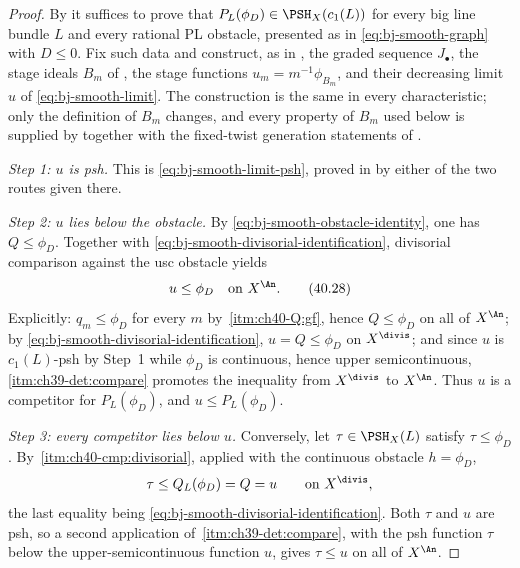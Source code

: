 \begin{proof}
By  it suffices to prove that
$P_L(\phi_D)\in\PSH_X(c_1(L))$ for every big line bundle $L$ and every
rational PL obstacle, presented as in \eqref{eq:bj-smooth-graph} with
$D\le0$.  Fix such data and construct, as in
, the graded sequence
$J_\bullet$, the stage ideals $B_m$ of , the
stage functions $u_m=m^{-1}\phi_{B_m}$, and their decreasing limit $u$ of
\eqref{eq:bj-smooth-limit}.  The construction is the same in every
characteristic; only the definition of $B_m$ changes, and every property of
$B_m$ used below is supplied by
 together with the fixed-twist generation
statements of .

\emph{Step 1: $u$ is psh.}  This is \eqref{eq:bj-smooth-limit-psh}, proved
in  by either of the two routes given there.

\emph{Step 2: $u$ lies below the obstacle.}
By \eqref{eq:bj-smooth-obstacle-identity}, one has $Q\le\phi_D$.
Together with \eqref{eq:bj-smooth-divisorial-identification}, divisorial
comparison against the usc obstacle yields
\[
                              u\le\phi_D
                              \quad\text{on }X^{\An}.
\tag{40.28}\label{eq:bj-smooth-limit-below-obstacle}
\]
Explicitly: $q_m\le\phi_D$ for every $m$ by
\,\cref{itm:ch40-Q:gf}, hence $Q\le\phi_D$ on all
of $X^{\An}$; by \eqref{eq:bj-smooth-divisorial-identification},
$u=Q\le\phi_D$ on $X^{\divis}$; and since $u$ is
$c_1(L)$-psh by Step~1 while $\phi_D$ is continuous, hence upper
semicontinuous,
\,\cref{itm:ch39-det:compare} promotes
the inequality from $X^{\divis}$ to $X^{\An}$.
Thus $u$ is a competitor for $P_L(\phi_D)$, and $u\le P_L(\phi_D)$.

\emph{Step 3: every competitor lies below $u$.}
Conversely, let $\tau\in\PSH_X(L)$ satisfy $\tau\le\phi_D$.
By \,\cref{itm:ch40-cmp:divisorial},
applied with the continuous obstacle $h=\phi_D$,
\[
 \tau\le Q_L(\phi_D)=Q=u
 \qquad\text{on }X^{\divis},
\]
the last equality being
\eqref{eq:bj-smooth-divisorial-identification}.  Both $\tau$ and $u$ are
psh, so a second application of
\,\cref{itm:ch39-det:compare}, with the
psh function $\tau$ below the upper-semicontinuous function $u$, gives
$\tau\le u$ on all of $X^{\An}$.


\end{proof}
